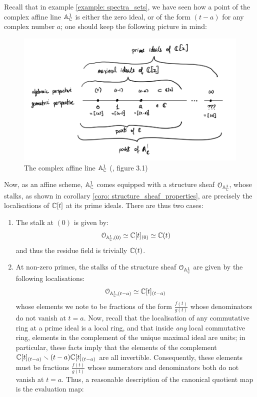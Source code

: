             \begin{example}
                Recall that in example \ref{example: spectra_sets}, we have seen how a point of the complex affine line $\mathbb{A}^1_{\mathbb{C}}$ is either the zero ideal, or of the form $(t - a)$ for any complex number $a$; one should keep the following picture in mind:
                    \begin{figure}[H]
				        \centering
				        \includegraphics[width=\linewidth,height=\textheight,keepaspectratio]{Figures/complex affine line.png}
				        \caption{The complex affine line $\mathbb{A}^1_{\mathbb{C}}$ (\cite{risingsea}, figure 3.1)}
				        \label{fig: complex_affine_line_stalks}
				    \end{figure}
			    \noindent
			    Now, as an affine scheme, $\mathbb{A}^1_{\mathbb{C}}$ comes equipped with a structure sheaf $\mathcal{O}_{\mathbb{A}^1_{\mathbb{C}}}$, whose stalks, as shown in corollary \ref{coro: structure_sheaf_properties}, are precisely the localisations of $\mathbb{C}[t]$ at its prime ideals. There are thus two cases:
			        \begin{enumerate}
			            \item The stalk at $(0)$ is given by:
			                $$\mathcal{O}_{\mathbb{A}^1_{\mathbb{C}}, (0)} \simeq \mathbb{C}[t]_{(0)} \simeq \mathbb{C}(t)$$
		                and thus the residue field is trivially $\mathbb{C}(t)$.
			            \item At non-zero primes, the stalks of the structure sheaf $\mathcal{O}_{\mathbb{A}^1_{\mathbb{C}}}$ are given by the following localisations:
			                $$\mathcal{O}_{\mathbb{A}^1_{\mathbb{C}}, (t - a)} \simeq \mathbb{C}[t]_{(t - a)}$$
		                whose elements we note to be fractions of the form $\frac{f(t)}{g(t)}$ whose denominators do not vanish at $t = a$. Now, recall that the localisation of any commutative ring at a prime ideal is a local ring, and that inside \textit{any} local commutative ring, elements in the complement of the unique maximal ideal are units; in particular, these facts imply that the elements of the complement $\mathbb{C}[t]_{(t - a)} \smallsetminus (t - a)\mathbb{C}[t]_{(t - a)}$ are all invertible. Consequently, these elements must be fractions $\frac{f(t)}{g(t)}$ whose numerators and denominators both do not vanish at $t = a$. Thus, a reasonable description of the canonical quotient map is the evaluation map:

\end{enumerate}
\end{example}
